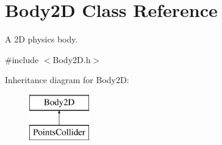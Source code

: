 \hypertarget{class_body2_d}{\section{Body2\+D Class Reference}
\label{class_body2_d}
}


A 2\+D physics body.  




{\ttfamily \#include $<$Body2\+D.\+h$>$}

Inheritance diagram for Body2\+D\+:\begin{figure}[H]
\begin{center}
\leavevmode
\includegraphics[height=2.000000cm]{class_body2_d}
\end{center}
\end{figure}
